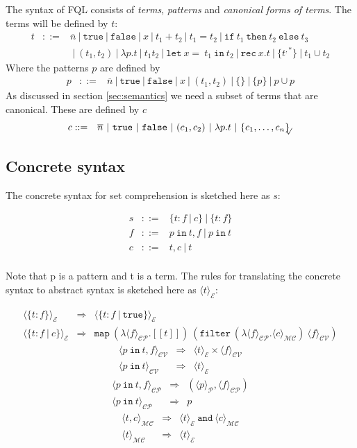 \documentclass[a4paper]{article}
\newcommand{\pipe}{\ | \ }
\newcommand{\s}[1]{\mathtt{#1}}
\newcommand{\sn}{\overline{n}}
\newcommand{\sLb}{\s{\{}}
\newcommand{\sRb}{\s{\}}}
\newcommand{\sif}{\s{if\ }}
\newcommand{\sthen}{\s{\ then\ }}
\newcommand{\selse}{\s{\ else\ }}
\newcommand{\sifthenelse}[3]{\sif #1 \sthen #2 \selse #3}
\newcommand{\sletin}[2]{\s{let\ } #1 \s{\ in\ } #2}
\newcommand{\srec}{\s{rec\ }}
\newcommand{\strue}{\s{true}}
\newcommand{\sfalse}{\s{false}}
\newcommand{\seq}{\s{=\ }}
\newcommand{\sset}[1]{\sLb #1 \sRb}
\newcommand{\ssetc}[1]{\sset{#1}_{\!\!\!\surd}}
\newcommand{\sugar}[2]{\langle#2\rangle_{\mathcal{#1}}}
\newcommand{\sug}[1]{\sugar{E}{#1}}
\begin{document}
The syntax of FQL consists of \emph{terms}, \emph{patterns} and \emph{canonical forms of terms}. The terms will be defined by $t$:
\begin{eqnarray*}
t & ::= & \sn \pipe \strue \pipe \sfalse \pipe x \pipe t_1 + t_2 \pipe t_1
= t_2 \pipe \sifthenelse{t_1}{t_2}{t_3} \\
& & \pipe (t_1,
t_2) \pipe \lambda p.t \pipe t_1 t_2 \pipe \sletin{x \seq t_1}{t_2}
\pipe \srec x.t \pipe \sset{t^{,*}} \pipe t_1 \cup t_2
\end{eqnarray*}
Where the patterns $p$ are defined by
\begin{eqnarray*}
p & ::= & \sn \pipe \strue \pipe \sfalse \pipe x \pipe (t_1, t_2) \pipe
\sset{} \pipe \sset{p} \pipe p \cup p
\end{eqnarray*}
As discussed in section \ref{sec:semantics} we need a subset of terms that are canonical. These are defined by $c$
\begin{eqnarray*}
c & ::= & \sn \pipe \strue \pipe \sfalse \pipe (c_1, c_2) \pipe \lambda
p.t \pipe \ssetc{c_1,\ldots,c_n}
\end{eqnarray*}

\subsection{Concrete syntax}
\label{sec:concreteSyntax}

The concrete syntax for set comprehension is sketched here as $s$:

\begin{eqnarray*}
s & ::= & \{ t : f \pipe c\} \pipe \{ t : f \}\\
f & ::= & p \s{\ in\ } t, f \pipe p \s{\ in\ } t\\
c & ::= & t, c \pipe t \\
\end{eqnarray*}

Note that p is a pattern and t is a term. The rules for translating
the concrete syntax to abstract syntax is sketched here as
$\sug{t}$:

\begin{eqnarray*}
\sug{\{t:f\}} & \Longrightarrow & \sug{\{t:f\ |\ \s{true}\}} \\
\sug{\{t:f\ |\ c\}} & \Longrightarrow &
\s{map\ }
(\lambda \sugar{CP}{f}. [\![ t ]\!])\
(\s{filter\ } (\lambda \sugar{CP}{f}. \sugar{MC}{c})\
\sugar{CV}{f})
\end{eqnarray*}
\begin{eqnarray*}
\sugar{CV}{p\s{\ in\ } t, f} & \Longrightarrow & \sug{t} \times \sugar{CV}{f} \\
\sugar{CV}{p\s{\ in\ } t} & \Longrightarrow & \sug{t}
\end{eqnarray*}
\begin{eqnarray*}
\sugar{CP}{p\s{\ in\ } t, f} & \Longrightarrow & (\sugar{P}{p}, \sugar{CP}{f}) \\
\sugar{CP}{p\s{\ in\ } t} & \Longrightarrow & p
\end{eqnarray*}
\begin{eqnarray*}
\sugar{MC}{t, c} & \Longrightarrow & \sug{t} \s{\ and\ } \sugar{MC}{c} \\
\sugar{MC}{t} & \Longrightarrow & \sug{t}
\end{eqnarray*}
\end{document}
